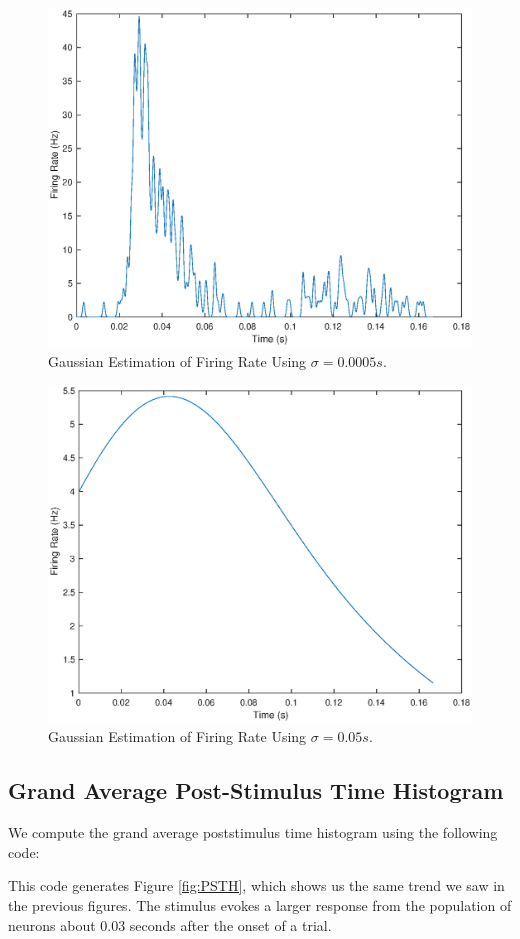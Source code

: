 \documentclass[11pt, oneside]{article}
\begin{document}
\begin{figure}[ht!]
\includegraphics[width=1\textwidth]{halfmillisecondplot.eps}
\caption{Gaussian Estimation of Firing Rate Using $\sigma = 0.0005s$.}
\label{fig:point5ms}
\end{figure}


\begin{figure}[ht!]
\includegraphics[width=1\textwidth]{fiftymillisecondplot.eps}
\caption{Gaussian Estimation of Firing Rate Using $\sigma = 0.05s$.}
\label{fig:50ms}
\end{figure}

\subsection{Grand Average Post-Stimulus Time Histogram}
We compute the grand average poststimulus time histogram using the following code:

This code generates Figure \ref{fig:PSTH}, which shows us the same trend we saw in the previous figures. The stimulus evokes a larger response from the population of neurons about 0.03 seconds after the onset of a trial.
\end{document}
